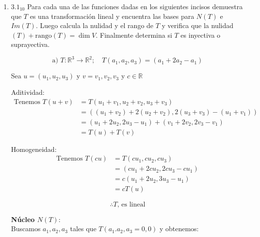 \documentclass{article}
\begin{document}
		\begin{enumerate}
			
			\item[] \(3.1_{10}\) Para cada una de las funciones dadas en los siguientes incisos demuestra que \(T\) es una transformación lineal y encuentra las bases para \(N(T)\) e \(Im(T)\). Luego calcula la nulidad y el rango de \(T\) y verifica que la nulidad\((T)+\text{rango}(T)=\dim V\). Finalmente determina si \(T\) es inyectiva o suprayectiva.
			
			\begin{equation*}
				\text{a) } T:\mathbb{R}^3\to\mathbb{R}^2; \quad T(a_1,a_2,a_3) = (a_1+2a_2 - a_1)
			\end{equation*}
			
			Sea \(u=(u_1,u_2,u_3)\) y \(v=v_1,v_2,v_3\) y \(c \in \mathbb{R}\)
			
			Aditividad:\\
			\begin{equation*}
				\begin{aligned}
					\text{Tenemos } T(u+v) &=T(u_1+v_1,u_2+v_2,u_3+v_3) \\
										   &=((u_1+v_2) +2(u_2+v_2), 2(u_3+v_3) -(u_1+v_1)) \\
										   &=(u_1+2u_2,2u_3-u_1)+(v_1+2v_2,2v_3-v_1) \\
										   &=T(u)+T(v)
				\end{aligned}
			\end{equation*}
			
			Homogeneidad: \\
			\begin{equation*}
				\begin{aligned}
					\text{Tenemos } T(cu) &=T(cu_1,cu_2,cu_3) \\
										  &=(cu_1+2cu_2,2cu_3-cu_1) \\
										  &=c(u_1+2u_2,3u_3-u_1) \\
										  &=cT(u)
				\end{aligned}
			\end{equation*}
			
			\begin{equation*}
				\boxed{\therefore T \text{, es lineal}}
			\end{equation*}
			
			\textbf{Núcleo \(N(T):\)} \\
			
			Buscamos \(a_1,a_2,a_3\) tales que \(T(a_1.a_2,a_3=0,0) \) y obtenemos:
			

\end{enumerate}
\end{document}
